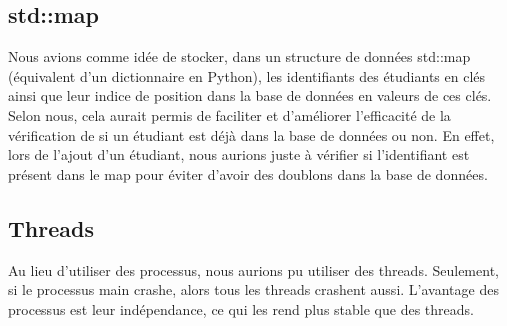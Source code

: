 \documentclass[utf8]{article}
\begin{document}
    \subsection{std::map}
    \indent{}
\par
    Nous avions comme idée de stocker, dans un structure de données std::map (équivalent d'un dictionnaire en Python), les identifiants des étudiants en clés ainsi que leur indice de position dans la base de données en valeurs de ces clés. \newline
    Selon nous, cela aurait permis de faciliter et d'améliorer l'efficacité de la vérification de si un étudiant est déjà dans la base de données ou non. \newline En effet, lors de l'ajout d'un étudiant, nous aurions juste à vérifier si l'identifiant est présent dans le map pour éviter d'avoir des doublons dans la base de données.
    \subsection{Threads}
    \indent{}
    \par
    Au lieu d'utiliser des processus, nous aurions pu utiliser des threads. Seulement, si le processus main crashe,
    alors tous les threads crashent aussi. L'avantage des processus est leur indépendance, ce qui les rend plus stable que des threads.
\end{document}
